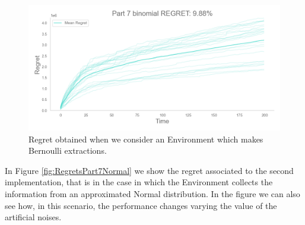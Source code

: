 \begin{figure}
    \includegraphics[width=\textwidth]{images/part7_binomial_regret.png}
    \caption{Regret obtained when we consider an Environment which makes Bernoulli extractions.}
    \label{regretPart7Binomial}
\end{figure}

In Figure \ref{fig:RegretsPart7Normal} we show the regret associated to the second implementation, that is in the case in which the Environment collects the information from an approximated Normal distribution. In the figure we can also see how, in this scenario, the performance changes varying the value of the artificial noises.

